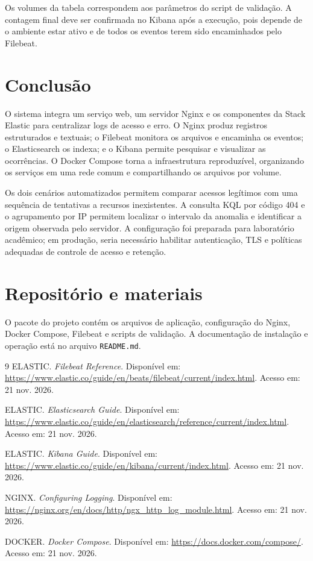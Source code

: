 \documentclass[10pt,a4paper]{article}
\begin{document}
Os volumes da tabela correspondem aos parâmetros do script de validação. A contagem final deve ser confirmada no Kibana após a execução, pois depende de o ambiente estar ativo e de todos os eventos terem sido encaminhados pelo Filebeat.

\newpage
\section{Conclusão}

O sistema integra um serviço web, um servidor Nginx e os componentes da Stack Elastic para centralizar logs de acesso e erro. O Nginx produz registros estruturados e textuais; o Filebeat monitora os arquivos e encaminha os eventos; o Elasticsearch os indexa; e o Kibana permite pesquisar e visualizar as ocorrências. O Docker Compose torna a infraestrutura reproduzível, organizando os serviços em uma rede comum e compartilhando os arquivos por volume.

Os dois cenários automatizados permitem comparar acessos legítimos com uma sequência de tentativas a recursos inexistentes. A consulta KQL por código 404 e o agrupamento por IP permitem localizar o intervalo da anomalia e identificar a origem observada pelo servidor. A configuração foi preparada para laboratório acadêmico; em produção, seria necessário habilitar autenticação, TLS e políticas adequadas de controle de acesso e retenção.

\section*{Repositório e materiais}

O pacote do projeto contém os arquivos de aplicação, configuração do Nginx, Docker Compose, Filebeat e scripts de validação. A documentação de instalação e operação está no arquivo \texttt{README.md}.

\begin{thebibliography}{9}
ELASTIC. \textit{Filebeat Reference}. Disponível em: \url{https://www.elastic.co/guide/en/beats/filebeat/current/index.html}. Acesso em: 21 nov. 2026.

ELASTIC. \textit{Elasticsearch Guide}. Disponível em: \url{https://www.elastic.co/guide/en/elasticsearch/reference/current/index.html}. Acesso em: 21 nov. 2026.

ELASTIC. \textit{Kibana Guide}. Disponível em: \url{https://www.elastic.co/guide/en/kibana/current/index.html}. Acesso em: 21 nov. 2026.

NGINX. \textit{Configuring Logging}. Disponível em: \url{https://nginx.org/en/docs/http/ngx_http_log_module.html}. Acesso em: 21 nov. 2026.

DOCKER. \textit{Docker Compose}. Disponível em: \url{https://docs.docker.com/compose/}. Acesso em: 21 nov. 2026.
\end{thebibliography}
\end{document}
